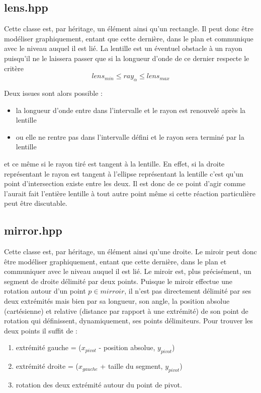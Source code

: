 \documentclass[a4paper,11pt]{report}
\begin{document}
\subsection[Lentille]{lens.hpp}
\begin{center}
\end{center}
Cette classe est, par héritage, un élément ainsi qu'un rectangle. Il peut donc
être modéliser graphiquement, entant que cette dernière, dans le plan et
communique avec le niveau auquel il est lié. La lentille est un éventuel
obstacle à un rayon puisqu'il ne le laissera passer que si la longueur d'onde de
ce dernier respecte le critère
$$lens_{min} \leq ray_{\alpha} \leq lens_{max}$$

Deux issues sont alors possible :
\begin{itemize}
	\item la longueur d'onde entre dans l'intervalle et le rayon est renouvelé
		après la lentille
	\item ou elle ne rentre pas dans l'intervalle défini et le rayon sera terminé par
		la lentille
\end{itemize}
et ce même si le rayon tiré est tangent à la lentille. En effet, si la droite
représentant le rayon est tangent à l'ellipse représentant la lentille c'est
qu'un point d'intersection existe entre les deux. Il est donc de ce point d'agir
comme l'aurait fait l'entière lentille à tout autre point même si cette
réaction particulière peut être discutable. 

\subsection[Miroir]{mirror.hpp}
Cette classe est, par héritage, un élément ainsi qu'une droite. Le miroir peut donc
être modéliser graphiquement, entant que cette dernière, dans le plan et
communiquer avec le niveau auquel il est lié. Le miroir est, plus précisément,
un segment de droite délimité par deux points. Puisque le miroir effectue une
rotation autour d'un point $p \in mirroir$, il n'est pas directement
délimité par ses deux extrémités mais bien par sa longueur, son angle, la position
absolue (cartésienne) et relative (distance par rapport à une extrémité)
de son point de rotation qui définissent, dynamiquement, ses points délimiteurs.
Pour trouver les deux points il suffit de :
\begin{enumerate}
	\item extrémité gauche = ($x_{pivot}$ - position absolue, $y_{pivot}$)
	\item extrémité droite = ($x_{gauche}$ + taille du segment, $y_{pivot}$)
	\item rotation des deux extrémité autour du point de pivot.
\end{enumerate}
\end{document}
